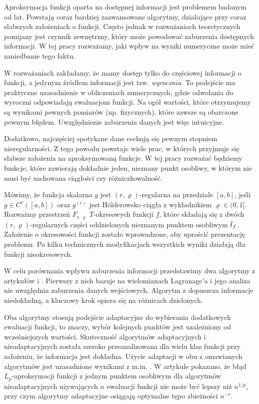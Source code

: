 \documentclass[oik, pdftex, man]{mgrwms}
\begin{document}
\begin{wstep}[Wprowadzenie]
    Aproksymacja funkcji oparta na dostępnej informacji jest problemem badanym od lat. Powstają coraz bardziej zaawansowane algorytmy, działające przy coraz słabszych założeniach o funkcji. Często jednak w rozważaniach teoretycznych pomijany jest czynnik zewnętrzny, który może powodować zaburzenia dostępnych informacji. W tej pracy rozważamy, jaki wpływ na wyniki numeryczne może mieć zaniedbanie tego faktu.

    W rozważaniach zakładamy, że mamy dostęp tylko do częściowej informacji o funkcji, a jedynym źródłem informacji jest tzw. \textit{wyrocznia}. To podejście ma praktyczne uzasadnienie w obliczeniach numerycznych, gdzie odwołania do wyroczni odpowiadają ewaluacjom funkcji. Na ogół wartości, które otrzymujemy są wynikami pewnych pomiarów (np. fizycznych), które zawsze są obarczone pewnym błędem. Uwzględnienie zaburzenia danych jest więc intuicyjne.
    
    Dodatkowo, najczęściej spotykane dane cechują się pewnym stopniem nieregularności. Z tego powodu powstaje wiele prac, w których przyjmuje się słabsze założenia na aproksymowaną funkcje. W tej pracy rozważać będziemy funkcje, które zawierają dokładnie jeden, nieznany punkt osobliwy, w którym nie musi być zachowana ciągłości czy różniczkowalność.

    Mówimy, że funkcja skalarna $g$ jest $(r, \varrho)$-regularna na przedziale $[a,b]$, jeśli $g \in C^{r}([a,b])$ oraz $g^{(r)}$ jest Hölderowsko ciągła z wykładnikiem $\varrho \in (0,1]$. Rozważmy przestrzeń $F_{r,\varrho}$ $T$-okresowych funkcji $f$, które składają się z dwóch $(r,\varrho)$-regularnych części oddzielonych nieznanym punktem osobliwym $\hat{t}_{f}$. Założenie o okresowości funkcji zostało wprowadzone, aby uprościć prezentację problemu. Po kilku technicznych modyfikacjach wszystkich wyniki działają dla funkcji nieokresowych.

    W celu porównania wpływu zaburzenia informacji przedstawimy dwa algorytmy z artykułów \cite{AoP} i \cite{CoDF}. Pierwszy z nich bazuje na wielomianach Lagranage'a i jego analiza nie uwzględnia zaburzenia danych wejściowych. Algorytm z \cite{AoP} dopuszcza informacje niedokładną, a kluczowy krok opiera się na różnicach dzielonych. 

    Oba algorytmy stosują podejście adaptacyjne do wybierania dodatkowych ewaluacji funkcji, to znaczy, wybór kolejnych punktów jest uzależniony od wcześniejszych wartości. Skuteczność algorytmów adaptacyjnych i nieadaptacyjnych została szeroko przeanalizowana dla wielu klas funkcji przy założeniu, że informacja jest dokładna. Użycie adaptacji w obu z omawianych algorytmów jest uzasadnione wynikami z m.in. \cite{PoA}. W artykule pokazano, że błąd $L_{p}$-aproksymacji funkcji z jednym punktem osobliwym dla algorytmów nieadaptacyjnych używających $n$ ewaluacji funkcji nie może być lepszy niż $n^{1/p}$, przy czym algorytmy adaptacyjne osiągają optymalne tępo zbieżności $n^{-r}$.


\end{wstep}
\end{document}
